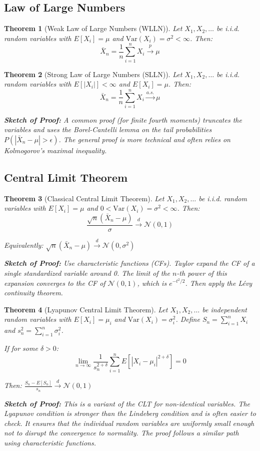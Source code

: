 \documentclass[12pt,a4paper]{article}
\newtheorem{theorem}{Theorem}[section]
\theoremstyle{remark}
\begin{document}
\subsection{Law of Large Numbers}

\begin{theorem}[Weak Law of Large Numbers (WLLN)]
Let $X_1, X_2, \ldots$ be i.i.d. random variables with $E[X_i] = \mu$ and $\text{Var}(X_i) = \sigma^2 < \infty$. Then:
$$\bar{X}_n = \frac{1}{n}\sum_{i=1}^n X_i \stackrel{p}{\to} \mu$$
\end{theorem}

\begin{theorem}[Strong Law of Large Numbers (SLLN)]
Let $X_1, X_2, \ldots$ be i.i.d. random variables with $E[|X_i|] < \infty$ and $E[X_i] = \mu$. Then:
$$\bar{X}_n = \frac{1}{n}\sum_{i=1}^n X_i \stackrel{a.s.}{\to} \mu$$

\textbf{Sketch of Proof:} A common proof (for finite fourth moments) truncates the variables and uses the Borel-Cantelli lemma on the tail probabilities $P(|\bar{X}_n - \mu| > \epsilon)$. The general proof is more technical and often relies on Kolmogorov's maximal inequality.
\end{theorem}

\subsection{Central Limit Theorem}

\begin{theorem}[Classical Central Limit Theorem]
Let $X_1, X_2, \ldots$ be i.i.d. random variables with $E[X_i] = \mu$ and $0 < \text{Var}(X_i) = \sigma^2 < \infty$. Then:
$$\frac{\sqrt{n}(\bar{X}_n - \mu)}{\sigma} \stackrel{d}{\to} \mathcal{N}(0,1)$$

Equivalently: $\sqrt{n}(\bar{X}_n - \mu) \stackrel{d}{\to} \mathcal{N}(0, \sigma^2)$

\textbf{Sketch of Proof:} Use characteristic functions (CFs). Taylor expand the CF of a single standardized variable around 0. The limit of the $n$-th power of this expansion converges to the CF of $\mathcal{N}(0,1)$, which is $e^{-t^2/2}$. Then apply the Lévy continuity theorem.
\end{theorem}


\begin{theorem}[Lyapunov Central Limit Theorem]
Let $X_1, X_2, \ldots$ be independent random variables with $E[X_i] = \mu_i$ and $\text{Var}(X_i) = \sigma_i^2$. Define $S_n = \sum_{i=1}^n X_i$ and $s_n^2 = \sum_{i=1}^n \sigma_i^2$.

If for some $\delta > 0$:
$$\lim_{n \to \infty} \frac{1}{s_n^{2+\delta}} \sum_{i=1}^n E[|X_i - \mu_i|^{2+\delta}] = 0$$

Then: $\frac{S_n - E[S_n]}{s_n} \stackrel{d}{\to} \mathcal{N}(0, 1)$

\textbf{Sketch of Proof:} This is a variant of the CLT for non-identical variables. The Lyapunov condition is stronger than the Lindeberg condition and is often easier to check. It ensures that the individual random variables are uniformly small enough not to disrupt the convergence to normality. The proof follows a similar path using characteristic functions.
\end{theorem}
\end{document}
